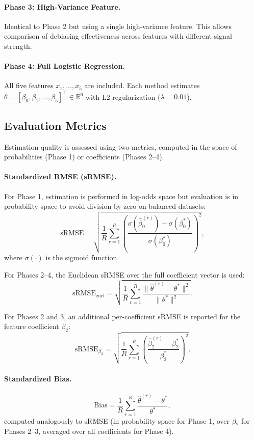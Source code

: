 \paragraph{Phase 3: High-Variance Feature.}
Identical to Phase 2 but using a single high-variance feature. This allows comparison of debiasing effectiveness across features with different signal strength.

\paragraph{Phase 4: Full Logistic Regression.}
All five features $x_1, \ldots, x_5$ are included. Each method estimates $\theta = [\beta_0, \beta_1, \ldots, \beta_5]^\top \in \mathbb{R}^6$ with L2 regularization ($\lambda = 0.01$).

\subsection{Evaluation Metrics}

Estimation quality is assessed using two metrics, computed in the space of probabilities (Phase 1) or coefficients (Phases 2--4).

\paragraph{Standardized RMSE (sRMSE).}
For Phase 1, estimation is performed in log-odds space but evaluation is in probability space to avoid division by zero on balanced datasets:
\[
    \text{sRMSE} = \sqrt{\frac{1}{R}\sum_{r=1}^{R} \left(\frac{\sigma(\hat{\beta}_0^{(r)}) - \sigma(\beta_0^*)}{\sigma(\beta_0^*)}\right)^2},
\]
where $\sigma(\cdot)$ is the sigmoid function.

For Phases 2--4, the Euclidean sRMSE over the full coefficient vector is used:
\[
    \text{sRMSE}_{\text{eucl}} = \sqrt{\frac{1}{R}\sum_{r=1}^{R} \frac{\|\hat{\theta}^{(r)} - \theta^*\|^2}{\|\theta^*\|^2}}.
\]

For Phases 2 and 3, an additional per-coefficient sRMSE is reported for the feature coefficient $\beta_2$:
\[
    \text{sRMSE}_{\beta_2} = \sqrt{\frac{1}{R}\sum_{r=1}^{R} \left(\frac{\hat{\beta}_2^{(r)} - \beta_2^*}{\beta_2^*}\right)^2}.
\]

\paragraph{Standardized Bias.}
\[
    \text{Bias} = \frac{1}{R}\sum_{r=1}^{R} \frac{\hat{\theta}^{(r)} - \theta^*}{\theta^*},
\]
computed analogously to sRMSE (in probability space for Phase 1, over $\beta_2$ for Phases 2--3, averaged over all coefficients for Phase 4).

